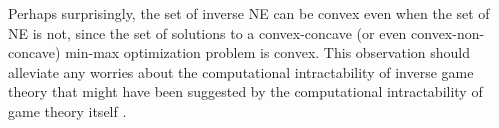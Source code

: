 
\begin{remark}
\label{rem:convex}
    Perhaps surprisingly, the set of inverse NE can be convex even when the set of NE is not, since the set of solutions to a convex-concave (or even convex-non-concave) 
    min-max optimization problem is convex. 
    This observation should alleviate any worries about the computational intractability of inverse game theory that might have been suggested by the computational intractability of game theory itself \citep{daskalakis2009complexity, chen2006settling}. 
\end{remark}



